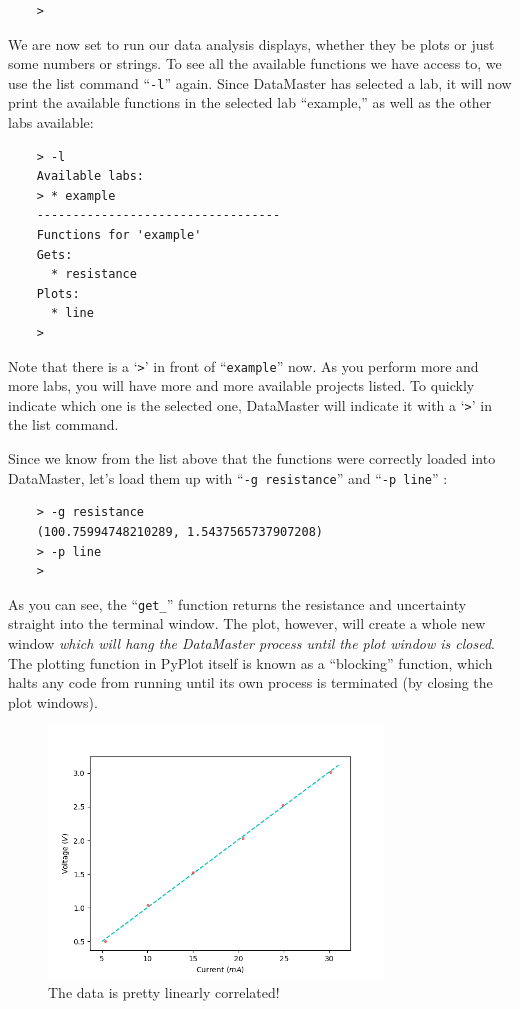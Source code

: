 \documentclass[12pt]{article}
\begin{document}
{\begin{framed}
\begin{lstlisting}
    > 
  \end{lstlisting}
\end{framed}
We are now set to run our data analysis displays, whether they be plots or just some numbers or strings. To see all the available functions we have access to, we use the list command ``\texttt{-l}'' again. Since DataMaster has selected a lab, it will now print the available functions in the selected lab ``example,'' as well as the other labs available:
\begin{framed}
  \begin{lstlisting}
    > -l 
    Available labs:
    > * example
    ----------------------------------
    Functions for 'example'
    Gets:
      * resistance
    Plots:
      * line
    > 
  \end{lstlisting}
\end{framed}
Note that there is a `\texttt{>}' in front of ``\texttt{example}'' now. As you perform more and more labs, you will have more and more available projects listed. To quickly indicate which one is the selected one, DataMaster will indicate it with a `\texttt{>}' in the list command.

Since we know from the list above that the functions were correctly loaded into DataMaster, let's load them up with ``\texttt{-g resistance}'' and ``\texttt{-p line}'' : 
\begin{framed}
  \begin{lstlisting}
    > -g resistance
    (100.75994748210289, 1.5437565737907208)
    > -p line
    > 
  \end{lstlisting}
\end{framed}
As you can see, the ``\texttt{get\_}'' function returns the resistance and uncertainty straight into the terminal window. The plot, however, will create a whole new window \textit{which will hang the DataMaster process until the plot window is closed}. The plotting function in PyPlot itself is known as a ``blocking'' function, which halts any code from running until its own process is terminated (by closing the plot windows).

\begin{figure}[!ht]
  \centering
    \includegraphics[width=3.5in]{assets/line.png}
  \caption{\textsf{The data is pretty linearly correlated!}}
  \label{fig:ex_line}
\end{figure}

}
\end{document}
